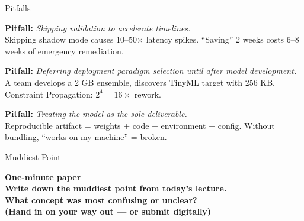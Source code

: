 \documentclass[aspectratio=169, 12pt]{beamer}
\begin{document}
\begin{frame}{Pitfalls}
\note{
%
%
}

\footnotesize
\textbf{Pitfall:} \textit{Skipping validation to accelerate timelines.}\\
{\scriptsize Skipping shadow mode causes 10--50$\times$ latency spikes. ``Saving'' 2 weeks costs 6--8 weeks of emergency remediation.}

\vspace{0.08cm}
\textbf{Pitfall:} \textit{Deferring deployment paradigm selection until after model development.}\\
{\scriptsize A team develops a 2 GB ensemble, discovers TinyML target with 256 KB. Constraint Propagation: $2^4 = 16\times$ rework.}

\vspace{0.08cm}
\textbf{Pitfall:} \textit{Treating the model as the sole deliverable.}\\
{\scriptsize Reproducible artifact = weights + code + environment + config. Without bundling, ``works on my machine'' = broken.}

\end{frame}


\begin{frame}{Muddiest Point}
\note{
%
}

\centering
\Large\bfseries One-minute paper\\[0.5cm]
\normalsize Write down the \textbf{muddiest point} from today's lecture.\\[0.2cm]
{\small What concept was most confusing or unclear?}\\[0.5cm]
{\footnotesize\textcolor{midgray}{(Hand in on your way out --- or submit digitally)}}
\end{frame}
\end{document}
